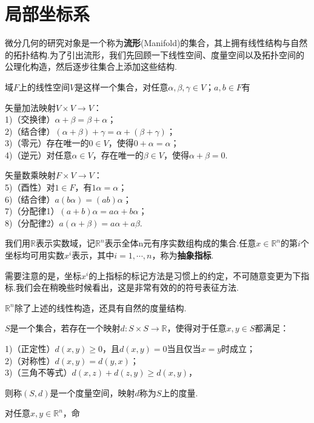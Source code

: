 \section{局部坐标系}\label{sec:Coordinates}
微分几何的研究对象是一个称为\textbf{流形}(Manifold)的集合，其上拥有线性结构与自然的拓扑结构.为了引出流形，我们先回顾一下线性空间、度量空间以及拓扑空间的公理化构造，然后逐步往集合上添加这些结构.
	\begin{definition}
		域$F$上的线性空间$V$是这样一个集合，对任意$\alpha,\beta,\gamma\in V$；$a,b\in F$有

		矢量加法映射$V\times V\rightarrow V$：\\
		1)（交换律）$\alpha+\beta=\beta+\alpha$；\\
		2)（结合律）$(\alpha+\beta)+\gamma=\alpha+(\beta+\gamma)$；\\
		3)（零元）存在唯一的$0\in V$，使得$0+\alpha=\alpha$；\\
		4)（逆元）对任意$\alpha\in V$，存在唯一的$\beta\in V$，使得$\alpha+\beta=0$.
		
		矢量数乘映射$F\times V\rightarrow V$：\\
		5)（酉性）对$1\in F$，有$1\alpha=\alpha$；\\
		6)（结合律）$a(b\alpha)=(ab)\alpha$；\\
		7)（分配律1）$(a+b)\alpha=a\alpha+b\alpha$；\\
		8)（分配律2）$a(\alpha+\beta)=a\alpha+a\beta$.
	\end{definition}
	我们用$\mathbb{R}$表示实数域，记$\mathbb{R}^n$表示全体n元有序实数组构成的集合.任意$x\in\mathbb{R}^n$的第$i$个坐标均可用实数$x^i$表示，其中$i=1,\cdots,n$，称为\textbf{抽象指标}.
	\begin{remark}
		需要注意的是，坐标$x^i$的上指标的标记方法是习惯上的约定，不可随意变更为下指标.我们会在稍晚些时候看出，这是非常有效的的符号表征方法.
	\end{remark}
	$\mathbb{R}^n$除了上述的线性构造，还具有自然的度量结构.
	\begin{definition}
		$S$是一个集合，若存在一个映射$d:S\times S\rightarrow \mathbb{R}$，使得对于任意$x,y\in S$都满足：

		1)（正定性）$d(x,y)\geqslant 0$，且$d(x,y)=0$当且仅当$x=y$时成立；\\
		2)（对称性）$d(x,y)=d(y,x)$；\\
		3)（三角不等式）$d(x,z)+d(z,y)\geqslant d(x,y)$，

		则称$(S,d)$是一个度量空间，映射$d$称为$S$上的度量.
	\end{definition}
	对任意$x,y\in \mathbb{R}^n$，命
